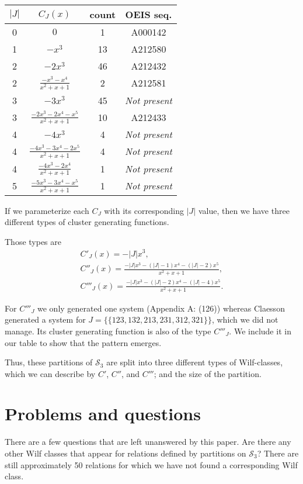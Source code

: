 \documentclass[a4paper, 11pt, english]{article}
\theoremstyle{definition}
\newcommand{\Sym}{\mathcal{S}}
\begin{document}
\begin{center}
\begin{tabular}{c|c|c|c}
    $|J|$ & $C_J(x)$ & count & OEIS seq. \\
    \hline
    0 & $0$ & 1 & A000142 \\
    1 & $-x^3$ & 13 & A212580 \\
    2 & $-2x^3$ & 46 & A212432 \\
    2 & $\frac{-x^3-x^4}{x^2+x+1}$ & 2 & A212581 \\
    3 & $-3x^3$ & 45 & \emph{Not present} \\
    3 & $\frac{-2x^3-2x^4-x^5}{x^2+x+1}$ & 10 & A212433 \\
    4 & $-4x^3$ & 4 & \emph{Not present} \\
    4 & $\frac{-4x^3-3x^4-2x^5}{x^2+x+1}$ & 4 & \emph{Not present}\\
    4 & $\frac{-4x^3-2x^4}{x^2+x+1}$ & 1 & \emph{Not present} \\ 
    \hline
    \hline
    5 & $\frac{-5x^3-3x^4-x^5}{x^2+x+1}$ & 1 & \emph{Not present} \\ 
\end{tabular}
\end{center}
If we parameterize each $C_J$ with its corresponding $|J|$ value, then we have
three different types of cluster generating functions.

Those types are 
\begin{gather*}
  C'_J(x) = -|J|x^3, \\
  C''_J(x) = \frac{-|J|x^3-(|J|-1)x^4-(|J|-2)x^5}{x^2+x+1}, \\
  C'''_J(x) = \frac{-|J|x^3-(|J|-2)x^4-(|J|-4)x^5}{x^2+x+1}.
\end{gather*}

For $C'''_J$ we only generated one system (Appendix A: (126)) whereas Claesson generated a system for
$J = \{\{ 123, 132, 213, 231, 312, 321 \}\}$, which we did not manage. Its cluster generating function
is also of the type $C'''_J$. We include it in our table to show that the pattern emerges.

Thus, these partitions of $\Sym_3$ are split into three different types
of Wilf-classes, which we can describe by $C'$, $C''$, and $C'''$; and the size
of the partition.

\section{Problems and questions}
There are a few questions that are left unanswered by this paper.
Are there any other Wilf classes that appear for relations defined by partitions on $\Sym_3$? There are
still approximately 50 relations for which we have not found a corresponding Wilf class. 
\end{document}
